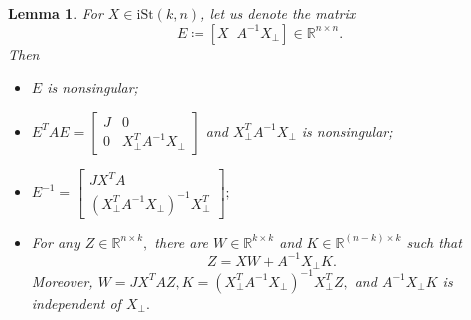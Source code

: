 \documentclass[10pt,a4paper]{amsart}
\newtheorem{lemma}{Lemma}
\def\Rbkk{{\mathbb{R}^{k\times k}}}
\def\Rbnk{{\mathbb{R}^{n\times k}}}
\def\Rbnn{{\mathbb{R}^{n\times n}}}
\def\iStkn{\mathrm{iSt}(k,n)}
\begin{document}
			\begin{lemma}\label{prop:eleproperty} 
				For $X\in \iStkn$, let us denote the matrix
				\begin{equation*}%
					E\coloneqq [X \;\; A^{-1}X_{\perp}]\in \Rbnn.
				\end{equation*} Then
				\begin{itemize}
					\item[i)] $E$ is nonsingular; 
					\item[ii)] $E^{T}AE = 
					\begin{bmatrix}
						J & 0 \\ 
						0 & X_{\perp}^{T}A^{-1}X_{\perp} 
					\end{bmatrix}$ and $X_{\perp}^{T}A^{-1}X_{\perp}$ is nonsingular;
					\item[iii)] $E^{-1}=
					\begin{bmatrix}
						JX^{T}A \\ 
						(X_{\perp}^{T}A^{-1}X_{\perp})^{-1}X_{\perp}^{T} 
					\end{bmatrix};$
					\item[iv)] For any $Z\in\Rbnk,$ there are $W\in\Rbkk$ and $K\in\mathbb{R}^{(n-k)\times k} $ such that
					\begin{equation}
						Z = XW + A^{-1}X_{\perp}K.\label{eq:eq21}
					\end{equation}
					Moreover, $W = JX^{T}AZ, K = (X_{\perp}^{T}A^{-1}X_{\perp})^{-1}X_{\perp}^{T}Z,$ and $A^{-1}X_{\perp}K$ is independent of $X_{\perp}.$
				\end{itemize} 	
			\end{lemma}
\end{document}
